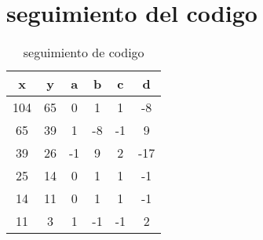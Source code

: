 \section{seguimiento del codigo}
\begin{table}[H]
\label{tablax}
\begin{center}
\begin{tabular}{|c|c|c|c|c|c|}
\hline 
x&y&a&b&c&d \\
\hline
104&65&0&1&1&-8\\\hline
65&39&1&-8&-1&9\\\hline
39&26&-1&9&2&-17\\\hline
25&14&0&1&1&-1\\\hline
14&11&0&1&1&-1\\\hline
11&3&1&-1&-1&2\\\hline
\end{tabular}
\end{center}
\caption{seguimiento de codigo}
\end{table}

      
      
    
      

